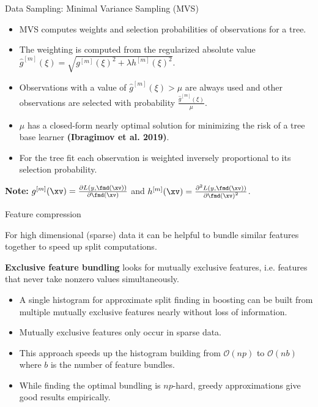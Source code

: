 \begin{vbframe}{Data Sampling: Minimal Variance Sampling (MVS)}


\begin{itemize}
  \item MVS computes weights and selection probabilities of observations for a tree.
  \item The weighting is computed from the regularized absolute value $\hat{g}^{[m]}(\xi)=\sqrt{g^{[m]}(\xi)^2 + \lambda h^{[m]}(\xi)^2}$.
  \item Observations with a value of $\hat{g}^{[m]}(\xi) > \mu$ are always used and other observations are selected with probability $\frac{\hat{g}^{[m]}(\xi)}{\mu}$.
  \item $\mu$ has a closed-form nearly optimal solution for minimizing the risk of a tree base learner \textbf{(Ibragimov et al. 2019)}.
  \item For the tree fit each observation is weighted inversely proportional to its selection probability.
\end{itemize}

\lz

\textbf{Note:} $g^{[m]}(\xv) = \frac{\partial L(y, \fmd(\xv))}{\partial \fmd(\xv)}$ and $h^{[m]}(\xv) = \frac{\partial^2 L(y, \fmd(\xv))}{\partial {\fmd(\xv)}^2}$.

\end{vbframe}


\begin{vbframe}{Feature compression}

For high dimensional (sparse) data it can be helpful to bundle similar features together to speed up split computations.

\lz

\textbf{Exclusive feature bundling} looks for mutually exclusive features, i.e. features that never take nonzero values simultaneously.

\lz

\begin{itemize}
  \item A single histogram for approximate split finding in boosting can be built from multiple mutually exclusive features nearly without loss of information.
  \item Mutually exclusive features only occur in sparse data.
  \item This approach speeds up the histogram building from $\mathcal{O}(np)$ to $\mathcal{O}(nb)$ where $b$ is the number of feature bundles.
  \item While finding the optimal bundling is $np$-hard, greedy approximations give good results empirically.
\end{itemize}

\end{vbframe}


